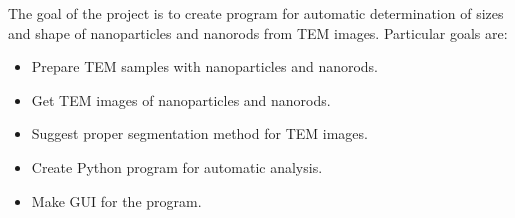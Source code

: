 \pagestyle{plain}

The goal of the project is to create program for automatic determination of sizes and shape of nanoparticles and nanorods from TEM images. Particular goals are:

\begin{itemize}
  \item Prepare TEM samples with nanoparticles and nanorods.
  \item Get TEM images of nanoparticles and nanorods.
  \item Suggest proper segmentation method for TEM images.
  \item Create Python program for automatic analysis.
  \item Make GUI for the program.
\end{itemize}